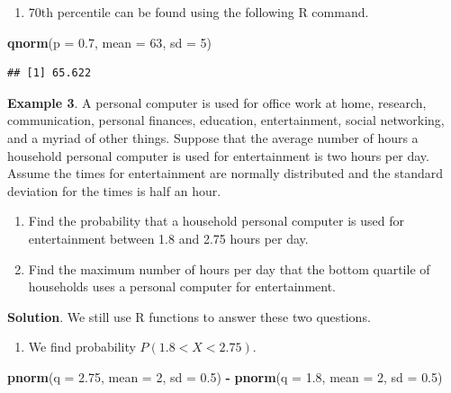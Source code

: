 \documentclass[
]{book}
\newenvironment{Shaded}{\begin{snugshade}}{\end{snugshade}}
\newcommand{\AttributeTok}[1]{\textcolor[rgb]{0.13,0.29,0.53}{#1}}
\newcommand{\DecValTok}[1]{\textcolor[rgb]{0.00,0.00,0.81}{#1}}
\newcommand{\FloatTok}[1]{\textcolor[rgb]{0.00,0.00,0.81}{#1}}
\newcommand{\FunctionTok}[1]{\textcolor[rgb]{0.13,0.29,0.53}{\textbf{#1}}}
\newcommand{\NormalTok}[1]{#1}
\newcommand{\SpecialCharTok}[1]{\textcolor[rgb]{0.81,0.36,0.00}{\textbf{#1}}}
\providecommand{\tightlist}{%
  \setlength{\itemsep}{0pt}\setlength{\parskip}{0pt}}
\begin{document}
\begin{enumerate}
\def\labelenumi{\arabic{enumi}.}
\setcounter{enumi}{3}
\tightlist
\item
  70th percentile can be found using the following R command.
\end{enumerate}

\begin{Shaded}
\begin{Highlighting}[]
\FunctionTok{qnorm}\NormalTok{(}\AttributeTok{p =} \FloatTok{0.7}\NormalTok{, }\AttributeTok{mean =} \DecValTok{63}\NormalTok{, }\AttributeTok{sd =} \DecValTok{5}\NormalTok{)}
\end{Highlighting}
\end{Shaded}

\begin{verbatim}
## [1] 65.622
\end{verbatim}

\hfill\break

\textbf{Example 3}. A personal computer is used for office work at home, research, communication, personal finances, education, entertainment, social networking, and a myriad of other things. Suppose that the average number of hours a household personal computer is used for entertainment is two hours per day. Assume the times for entertainment are normally distributed and the standard deviation for the times is half an hour.

\begin{enumerate}
\def\labelenumi{\arabic{enumi}.}
\item
  Find the probability that a household personal computer is used for entertainment between 1.8 and 2.75 hours per day.
\item
  Find the maximum number of hours per day that the bottom quartile of households uses a personal computer for entertainment.
\end{enumerate}

\textbf{Solution}. We still use R functions to answer these two questions.

\begin{enumerate}
\def\labelenumi{\arabic{enumi}.}
\tightlist
\item
  We find probability \(P(1.8 < X < 2.75)\).
\end{enumerate}

\begin{Shaded}
\begin{Highlighting}[]
\FunctionTok{pnorm}\NormalTok{(}\AttributeTok{q =} \FloatTok{2.75}\NormalTok{, }\AttributeTok{mean =} \DecValTok{2}\NormalTok{, }\AttributeTok{sd =} \FloatTok{0.5}\NormalTok{) }\SpecialCharTok{{-}} \FunctionTok{pnorm}\NormalTok{(}\AttributeTok{q =} \FloatTok{1.8}\NormalTok{, }\AttributeTok{mean =} \DecValTok{2}\NormalTok{, }\AttributeTok{sd =} \FloatTok{0.5}\NormalTok{)}
\end{Highlighting}
\end{Shaded}
\end{document}
